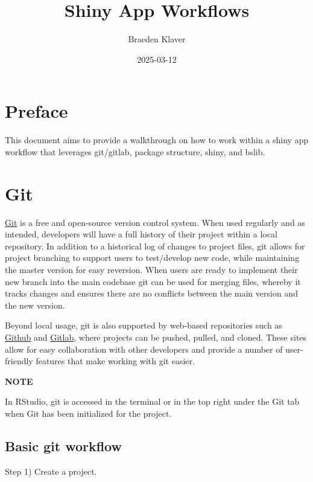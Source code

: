 \documentclass[
]{book}
\title{Shiny App Workflows}
\author{Braeden Klaver}
\date{2025-03-12}
\begin{document}
\maketitle

{
\setcounter{tocdepth}{1}
\tableofcontents
}
\hypertarget{preface}{%
\chapter*{Preface}\label{preface}}

This document aims to provide a walkthrough on how to work within
a shiny app workflow that leverages git/gitlab, package structure,
shiny, and bslib.

\hypertarget{git}{%
\chapter{Git}\label{git}}

\href{https://git-scm.com/}{Git} is a free and open-source version control system. When used regularly and as intended, developers will have a full history of their project within a local repository. In addition to a historical log of changes to project files, git allows for project branching to support users to test/develop new code, while maintaining the master version for easy reversion. When users are ready to implement their new branch into the main codebase git can be used for merging files, whereby it tracks changes and ensures there are no conflicts between the main version and the new version.

Beyond local usage, git is also supported by web-based repositories such as \href{https://github.com/}{Github} and \href{https://about.gitlab.com/}{Gitlab}, where projects can be pushed, pulled, and cloned. These sites allow for easy collaboration with other developers and provide a number of user-friendly features that make working with git easier.

\textbf{NOTE}

In RStudio, git is accessed in the terminal or in the top right under the Git tab when Git has been initialized for the project.

\hypertarget{basic-workflow}{%
\section{Basic git workflow}\label{basic-workflow}}

Step 1) Create a project.
\end{document}
